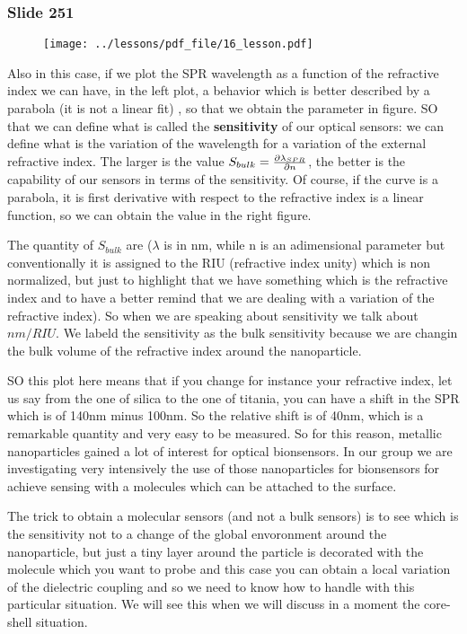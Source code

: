 \documentclass[../main/main.tex]{subfiles}
\begin{document}
\newpage

\subsubsection{Slide 251}

\begin{figure}[h!]
\centering
\texttt{[image: ../lessons/pdf\_file/16\_lesson.pdf]}
\end{figure}

Also in this case, if we plot the SPR wavelength as a function of the refractive index we can have, in the left plot, a behavior which is better described by a parabola (it is not a linear fit) , so that we obtain the parameter in figure. SO that we can define what is called the \textbf{sensitivity} of our optical sensors: we can define what is the variation of the wavelength for a variation of the external refractive index. The larger is the value \( S_{bulk} = \pdv{\lambda _{SPR}}{n}  \), the better is the capability of our sensors in terms of the sensitivity.
Of course, if the curve is a parabola, it is first derivative with respect to the refractive index is a linear function, so we can obtain the value in the right figure.

 The quantity of \( S_{bulk} \) are (\( \lambda  \) is in nm, while n is an adimensional parameter but conventionally it is assigned to the RIU (refractive index unity) which is non normalized, but just to highlight that we have something which is the refractive index and to have a better remind that we are dealing with a variation of the refractive index). So when we are speaking about sensitivity we talk about \( nm/RIU \). We labeld the sensitivity as the bulk sensitivity because we are changin the bulk volume of the refractive index around the nanoparticle.

SO this plot here means that if you change for instance your refractive index, let us say from the one of silica to the one of titania, you can have a shift in the SPR which is of 140nm minus 100nm. So the relative shift is of 40nm, which is a remarkable quantity and very easy to be measured.
So for this reason, metallic nanoparticles gained a lot of interest for optical bionsensors. In our group we are investigating very intensively the use of those nanoparticles for bionsensors for achieve sensing with a molecules which can be attached to the surface.

The trick to obtain a molecular sensors (and not a bulk sensors) is to see which is the sensitivity not to a change of the global envoronment around the nanoparticle, but just a tiny layer around the particle is decorated with the molecule which you want to probe and this case you can obtain a local variation of the dielectric coupling and so we need to know how to handle with this particular situation. We will see this when we will discuss in a moment the core-shell situation.
\end{document}
